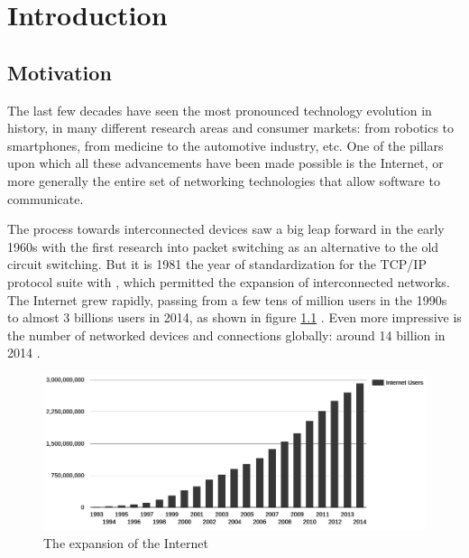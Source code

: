 \chapter{Introduction}
\label{chap:introduction}

\section{Motivation}
The last few decades have seen the most pronounced technology evolution in history, in many different research areas and consumer markets: from robotics to smartphones, from medicine to the automotive industry, etc. One of the pillars upon which all these advancements have been made possible is the Internet, or more generally the entire set of networking technologies that allow software to communicate. 


The process towards interconnected devices saw a big leap forward in the early 1960s with the first research into packet switching as an alternative to the old circuit switching. But it is 1981 the year of standardization for the TCP/IP protocol suite with , which permitted the expansion of interconnected networks. The Internet grew rapidly, passing from a few tens of million users in the 1990s to almost 3 billions users in 2014, as shown in figure \ref{fig:internet_growth} \cite{internetlivestats}. Even more impressive is the number of networked devices and connections globally: around 14 billion in 2014 \cite{cisco}.

\begin{figure}[!htb]
\centering
\includegraphics[width=\textwidth]{images/internet_growth}
\caption{The expansion of the Internet}
\label{fig:internet_growth}
\end{figure}

